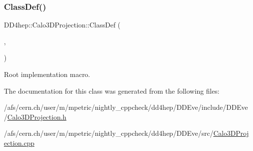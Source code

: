\subsubsection{\texorpdfstring{Class\+Def()}{ClassDef()}}
{\footnotesize\ttfamily D\+D4hep\+::\+Calo3\+D\+Projection\+::\+Class\+Def (\begin{DoxyParamCaption}\item[{\hyperlink{class_d_d4hep_1_1_calo3_d_projection}{Calo3\+D\+Projection}}]{,  }\item[{0}]{ }\end{DoxyParamCaption})}



Root implementation macro. 



The documentation for this class was generated from the following files\+:\begin{DoxyCompactItemize}
\item 
/afs/cern.\+ch/user/m/mpetric/nightly\+\_\+cppcheck/dd4hep/\+D\+D\+Eve/include/\+D\+D\+Eve/\hyperlink{_calo3_d_projection_8h}{Calo3\+D\+Projection.\+h}\item 
/afs/cern.\+ch/user/m/mpetric/nightly\+\_\+cppcheck/dd4hep/\+D\+D\+Eve/src/\hyperlink{_calo3_d_projection_8cpp}{Calo3\+D\+Projection.\+cpp}\end{DoxyCompactItemize}
